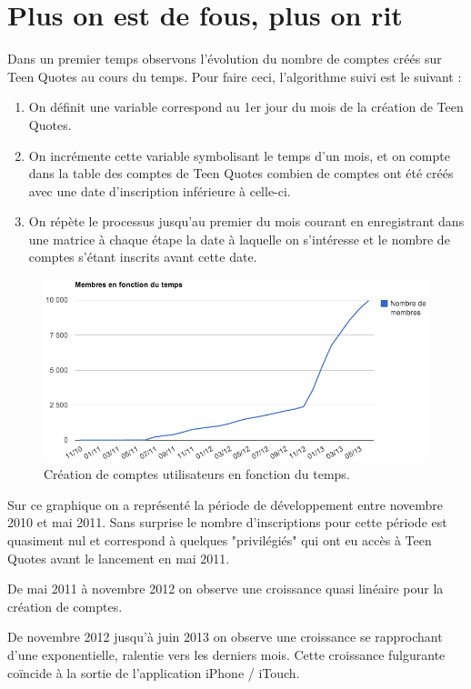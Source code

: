 \documentclass{report}
\begin{document}
	\section{Plus on est de fous, plus on rit}
	Dans un premier temps observons l'évolution du nombre de comptes créés sur Teen Quotes au cours du temps. Pour faire ceci, l'algorithme suivi est le suivant :
	\vspace{10px}
	\begin{enumerate}
		\item On définit une variable correspond au 1er jour du mois de la création de Teen Quotes.
		\item On incrémente cette variable symbolisant le temps d'un mois, et on compte dans la table des comptes de Teen Quotes combien de comptes ont été créés avec une date d'inscription inférieure à celle-ci.
		\item On répète le processus jusqu'au premier du mois courant en enregistrant dans une matrice à chaque étape la date à laquelle on s'intéresse et le nombre de comptes s'étant inscrits avant cette date. 
	\end{enumerate}
	\vspace{10px}
	\begin{figure}[H]
		\center
		\includegraphics[width=450px]{images/membresTemps.png}
		\caption{Création de comptes utilisateurs en fonction du temps.}
	\end{figure}
	Sur ce graphique on a représenté la période de développement entre novembre 2010 et mai 2011. Sans surprise le nombre d'inscriptions pour cette période est quasiment nul et correspond à quelques "privilégiés" qui ont eu accès à Teen Quotes avant le lancement en mai 2011.

	De mai 2011 à novembre 2012 on observe une croissance quasi linéaire pour la création de comptes.

	De novembre 2012 jusqu'à juin 2013 on observe une croissance se rapprochant d'une exponentielle, ralentie vers les derniers mois. Cette croissance fulgurante coïncide à la sortie de l'application iPhone / iTouch.\\
\end{document}
